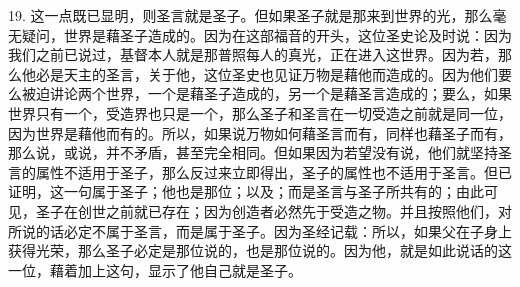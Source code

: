 19. 这一点既已显明，则圣言就是圣子。但如果圣子就是那来到世界的光，那么毫无疑问，世界是藉圣子造成的。因为在这部福音的开头，这位圣史论及时说：因为我们之前已说过，基督本人就是那普照每人的真光，正在进入这世界。因为若，那么他必是天主的圣言，关于他，这位圣史也见证万物是藉他而造成的。因为他们要么被迫讲论两个世界，一个是藉圣子造成的，另一个是藉圣言造成的；要么，如果世界只有一个，受造界也只是一个，那么圣子和圣言在一切受造之前就是同一位，因为世界是藉他而有的。所以，如果说万物如何藉圣言而有，同样也藉圣子而有，那么说，或说，并不矛盾，甚至完全相同。但如果因为若望没有说，他们就坚持圣言的属性不适用于圣子，那么反过来立即得出，圣子的属性也不适用于圣言。但已证明，这一句属于圣子；他也是那位；以及；而是圣言与圣子所共有的；由此可见，圣子在创世之前就已存在；因为创造者必然先于受造之物。并且按照他们，对所说的话必定不属于圣言，而是属于圣子。因为圣经记载：所以，如果父在子身上获得光荣，那么圣子必定是那位说的，也是那位说的。因为他，就是如此说话的这一位，藉着加上这句，显示了他自己就是圣子。\par

